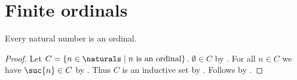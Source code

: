 \section{Finite ordinals}




\begin{classification}\label{natural_number_is_ordinal}
    Every natural number is an ordinal.
\end{classification}
\begin{proof}
    Let $C=\{n\in\naturals\mid \text{$n$ is an ordinal}\}$.
    $\emptyset\in C$ by .
    For all $n\in C$ we have $\suc{n}\in C$
        by .
    Thus $C$ is an inductive set by .
    Follows by .
\end{proof}

